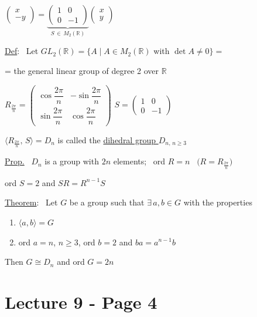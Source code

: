 \bigskip
\noindent $\begin{pmatrix}x\\-y\end{pmatrix} = \underbrace{\begin{pmatrix}1&0\\0&-1\end{pmatrix}}_{S\,\in\, M_2(\mathbb{R})}\begin{pmatrix}x\\y\end{pmatrix}$

\bigskip
\noindent\underline{Def}: \ Let $GL_2(\mathbb{R}) = \{A \mid A\in M_2(\mathbb{R})$ with $\det A\neq 0\} =$

\noindent = the general linear group of degree 2 over $\mathbb{R}$

\bigskip
\noindent $R_{\frac{2\pi}{n}} = \begin{pmatrix}\cos\dfrac{2\pi}{n} & -\sin\dfrac{2\pi}{n}\\[6pt] \sin\dfrac{2\pi}{n} & \cos\dfrac{2\pi}{n}\end{pmatrix}$ \hfill $S=\begin{pmatrix}1&0\\0&-1\end{pmatrix}$

\bigskip
\noindent $\big\langle R_{\frac{2\pi}{n}},\,S\big\rangle = D_n$ is called the \underline{dihedral group $D_{n,\,n\geq 3}$}

\bigskip
\noindent\underline{Prop.} \ $D_n$ is a group with $2n$ elements; \ ord $R=n$ \ $\big(R=R_{\frac{2\pi}{n}}\big)$

\noindent ord $S=2$ and $SR=R^{n-1}S$

\bigskip
\bigskip
\noindent\underline{Theorem}: \ Let $G$ be a group such that $\exists\,a,b\in G$ with the properties

\begin{enumerate}
\item[1)] $\langle a,b\rangle = G$
\item[2)] ord $a=n$, $n\geq 3$, ord $b=2$ and $ba=a^{n-1}b$
\end{enumerate}

\noindent Then $G\cong D_n$ and ord $G=2n$




\section*{Lecture 9 - Page 4}


